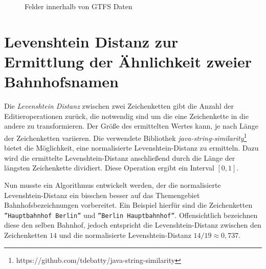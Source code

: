 \begin{figure}[!hp]
  \centering
   \caption{Felder innerhalb von GTFS Daten}
   \label{fig:gtfs_uml}
\end{figure}

\section{Levenshtein Distanz zur Ermittlung der Ähnlichkeit zweier Bahnhofsnamen}
\label{sec:appendix:levenshtein}
Die \textit{Levenshtein Distanz} zwischen zwei Zeichenketten gibt die Anzahl der Editieroperationen zurück, die notwendig sind um die eine Zeichenkette in die andere zu transformieren.
Der Größe des ermittelten Wertes kann, je nach Länge der Zeichenketten variieren. 
Die verwendete Bibliothek \textit{java-string-similarity}\footnote{https://github.com/tdebatty/java-string-similarity} bietet die Möglichkeit, eine normalisierte Levenshtein-Distanz zu ermitteln. Dazu wird die ermittelte Levenshtein-Distanz anschließend durch die Länge der längsten Zeichenkette dividiert.
Diese Operation ergibt ein Interval $[0,1]$.

Nun musste ein Algorithmus entwickelt werden, der die normalisierte Levenshtein-Distanz ein bisschen besser auf das Themengebiet Bahnhofsbezeichnungen vorbereitet. Ein Beispiel hierfür sind die Zeichenketten \texttt{''Hauptbahnhof Berlin''} und \texttt{''Berlin Hauptbahnhof''}. Offensichtlich bezeichnen diese den selben Bahnhof, jedoch entspricht die Levenshtein-Distanz zwischen den Zeichenketten $14$ und die normalisierte Levenshtein-Distanz $14/19\approx0,737$.
 
